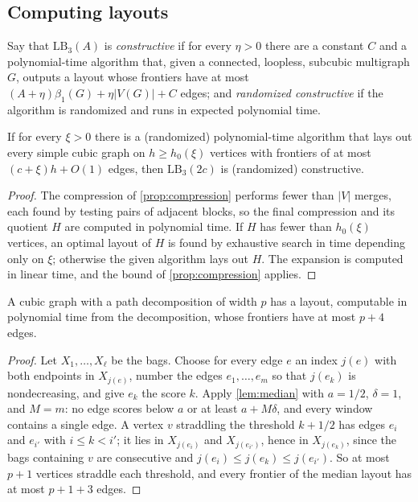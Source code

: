 \documentclass[11pt]{article}
\theoremstyle{plain}
\theoremstyle{definition}
\theoremstyle{remark}
\newcommand{\LB}{\mathrm{LB}}
\newcommand{\card}[1]{\lvert #1\rvert}
\begin{document}
\subsection{Computing layouts}

Say that $\LB_3(A)$ is \emph{constructive} if for every $\eta > 0$ there are a constant $C$ and
a polynomial-time algorithm that, given a connected, loopless, subcubic multigraph $G$, outputs a
layout whose frontiers have at most $(A + \eta)\beta_1(G) + \eta\card{V(G)} + C$ edges; and
\emph{randomized constructive} if the algorithm is randomized and runs in expected polynomial
time.

\begin{lemma}
\label{lem:constructive-compression}
If for every $\xi > 0$ there is a (randomized) polynomial-time algorithm that lays out every
simple cubic graph on $h \ge h_0(\xi)$ vertices with frontiers of at most $(c + \xi)h + O(1)$
edges, then $\LB_3(2c)$ is (randomized) constructive.
\end{lemma}

\begin{proof}
The compression of \cref{prop:compression} performs fewer than $\card V$ merges, each found by
testing pairs of adjacent blocks, so the final compression and its quotient $H$ are computed in
polynomial time. If $H$ has fewer than $h_0(\xi)$ vertices, an optimal layout of $H$ is found by
exhaustive search in time depending only on $\xi$; otherwise the given algorithm lays out $H$.
The expansion is computed in linear time, and the bound of \cref{prop:compression} applies.
\end{proof}

\begin{lemma}
\label{lem:pathwidth}
A cubic graph with a path decomposition of width $p$ has a layout, computable in polynomial time
from the decomposition, whose frontiers have at most $p + 4$ edges.
\end{lemma}

\begin{proof}
Let $X_1, \dots, X_\ell$ be the bags. Choose for every edge $e$ an index $j(e)$ with both
endpoints in $X_{j(e)}$, number the edges $e_1, \dots, e_m$ so that $j(e_k)$ is nondecreasing, and
give $e_k$ the score $k$. Apply \cref{lem:median} with $a = 1/2$, $\delta = 1$, and $M = m$: no
edge scores below $a$ or at least $a + M\delta$, and every window contains a single edge. A vertex
$v$ straddling the threshold $k + 1/2$ has edges $e_i$ and $e_{i'}$ with $i \le k < i'$; it lies in
$X_{j(e_i)}$ and $X_{j(e_{i'})}$, hence in $X_{j(e_k)}$, since the bags containing $v$ are
consecutive and $j(e_i) \le j(e_k) \le j(e_{i'})$. So at most $p + 1$ vertices straddle each
threshold, and every frontier of the median layout has at most $p + 1 + 3$ edges.
\end{proof}
\end{document}
